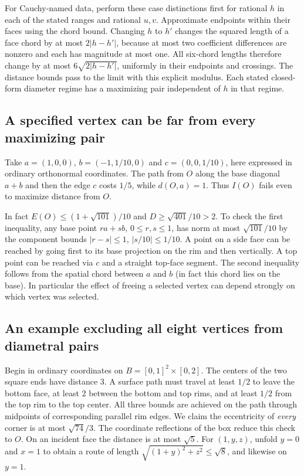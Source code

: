 \documentclass[10pt,letterpaper]{article}
\begin{document}
For Cauchy-named data, perform these case distinctions first for rational
$h$ in each of the stated ranges and rational $u,v$. Approximate endpoints within their faces
using the chord bound. Changing $h$ to $h'$ changes the squared length
of a face chord by at most $2|h-h'|$, because at most two coefficient
differences are nonzero and each has magnitude at most one. All six-chord
lengths therefore change by at most $6\sqrt{2|h-h'|}$, uniformly in their
endpoints and crossings. The distance bounds pass to the limit with this
explicit modulus. Each stated closed-form diameter regime has a maximizing
pair independent of $h$ in that regime.

\subsection{A specified vertex can be far from every maximizing pair}
Take $a=(1,0,0)$, $b=(-1,1/10,0)$ and $c=(0,0,1/10)$, here expressed in
ordinary orthonormal coordinates. The path from $O$ along the base diagonal
$a+b$ and then the edge $c$ costs $1/5$, while $d(O,a)=1$. Thus $I(O)$
fails even to maximize distance from $O$.

In fact $E(O)\le(1+\sqrt{101})/10$ and $D\ge\sqrt{401}/10>2$. To check
the first inequality, any base point $r a+s b$, $0\le r,s\le1$, has norm at
most $\sqrt{101}/10$ by the component bounds $|r-s|\le1$, $|s/10|\le1/10$.
A point on a side face can be reached by going first to its base projection
on the rim and then vertically. A top point can be reached via $c$ and a
straight top-face segment. The second inequality follows from the spatial
chord between $a$ and $b$ (in fact this chord lies on the base). In
particular the effect of freeing a selected vertex can depend strongly on
which vertex was selected.

\subsection{An example excluding all eight vertices from diametral pairs}
Begin in ordinary coordinates on $B=[0,1]^2\times[0,2]$. The centers of the
two square ends have distance $3$. A surface path must travel at least $1/2$
to leave the bottom face, at least $2$ between the bottom and top rims, and
at least $1/2$ from the top rim to the top center. All three bounds are
achieved on the path through midpoints of corresponding parallel rim edges.
We claim the eccentricity of \emph{every} corner is at most $\sqrt{74}/3$.
The coordinate reflections of the box reduce this check to $O$.
On an incident face the distance is at most $\sqrt5$. For $(1,y,z)$,
unfold $y=0$ and $x=1$ to obtain a route of length
$\sqrt{(1+y)^2+z^2}\le\sqrt8$, and likewise on $y=1$.
\end{document}
